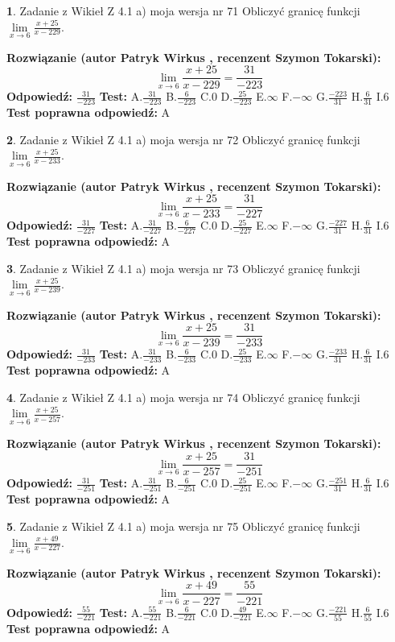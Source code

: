 \documentclass[12pt, a4paper]{article}
\theoremstyle{definition} %
\newtheorem{zad}{}
\newcommand{\zadStart}[1]{\begin{zad}#1\newline}
\newcommand{\zadStop}{\end{zad}}
\newcommand{\rozwStart}[2]{\noindent \textbf{Rozwiązanie (autor #1 , recenzent #2): }\newline}
\newcommand{\rozwStop}{\newline}
\newcommand{\odpStart}{\noindent \textbf{Odpowiedź:}\newline}
\newcommand{\odpStop}{\newline}
\newcommand{\testStart}{\noindent \textbf{Test:}\newline}
\newcommand{\testStop}{\newline}
\newcommand{\kluczStart}{\noindent \textbf{Test poprawna odpowiedź:}\newline}
\newcommand{\kluczStop}{\newline}
\begin{document}
\zadStart{Zadanie z Wikieł Z 4.1 a) moja wersja nr 71}
Obliczyć granicę funkcji $\lim\limits_{x\to6}\frac{x+25}{x-229}$.
\zadStop
\rozwStart{Patryk Wirkus}{Szymon Tokarski}
$$\lim\limits_{x\to6}\frac{x+25}{x-229} = \frac{31}{-223}$$
\rozwStop
\odpStart
$\frac{31}{-223}$
\odpStop
\testStart
A.$\frac{31}{-223}$
B.$\frac{6}{-223}$
C.$0$
D.$\frac{25}{-223}$
E.$\infty$
F.$-\infty$
G.$\frac{-223}{31}$
H.$\frac{6}{31}$
I.$6$
\testStop
\kluczStart
A
\kluczStop



\zadStart{Zadanie z Wikieł Z 4.1 a) moja wersja nr 72}
Obliczyć granicę funkcji $\lim\limits_{x\to6}\frac{x+25}{x-233}$.
\zadStop
\rozwStart{Patryk Wirkus}{Szymon Tokarski}
$$\lim\limits_{x\to6}\frac{x+25}{x-233} = \frac{31}{-227}$$
\rozwStop
\odpStart
$\frac{31}{-227}$
\odpStop
\testStart
A.$\frac{31}{-227}$
B.$\frac{6}{-227}$
C.$0$
D.$\frac{25}{-227}$
E.$\infty$
F.$-\infty$
G.$\frac{-227}{31}$
H.$\frac{6}{31}$
I.$6$
\testStop
\kluczStart
A
\kluczStop



\zadStart{Zadanie z Wikieł Z 4.1 a) moja wersja nr 73}
Obliczyć granicę funkcji $\lim\limits_{x\to6}\frac{x+25}{x-239}$.
\zadStop
\rozwStart{Patryk Wirkus}{Szymon Tokarski}
$$\lim\limits_{x\to6}\frac{x+25}{x-239} = \frac{31}{-233}$$
\rozwStop
\odpStart
$\frac{31}{-233}$
\odpStop
\testStart
A.$\frac{31}{-233}$
B.$\frac{6}{-233}$
C.$0$
D.$\frac{25}{-233}$
E.$\infty$
F.$-\infty$
G.$\frac{-233}{31}$
H.$\frac{6}{31}$
I.$6$
\testStop
\kluczStart
A
\kluczStop



\zadStart{Zadanie z Wikieł Z 4.1 a) moja wersja nr 74}
Obliczyć granicę funkcji $\lim\limits_{x\to6}\frac{x+25}{x-257}$.
\zadStop
\rozwStart{Patryk Wirkus}{Szymon Tokarski}
$$\lim\limits_{x\to6}\frac{x+25}{x-257} = \frac{31}{-251}$$
\rozwStop
\odpStart
$\frac{31}{-251}$
\odpStop
\testStart
A.$\frac{31}{-251}$
B.$\frac{6}{-251}$
C.$0$
D.$\frac{25}{-251}$
E.$\infty$
F.$-\infty$
G.$\frac{-251}{31}$
H.$\frac{6}{31}$
I.$6$
\testStop
\kluczStart
A
\kluczStop



\zadStart{Zadanie z Wikieł Z 4.1 a) moja wersja nr 75}
Obliczyć granicę funkcji $\lim\limits_{x\to6}\frac{x+49}{x-227}$.
\zadStop
\rozwStart{Patryk Wirkus}{Szymon Tokarski}
$$\lim\limits_{x\to6}\frac{x+49}{x-227} = \frac{55}{-221}$$
\rozwStop
\odpStart
$\frac{55}{-221}$
\odpStop
\testStart
A.$\frac{55}{-221}$
B.$\frac{6}{-221}$
C.$0$
D.$\frac{49}{-221}$
E.$\infty$
F.$-\infty$
G.$\frac{-221}{55}$
H.$\frac{6}{55}$
I.$6$
\testStop
\kluczStart
A
\kluczStop
\end{document}
